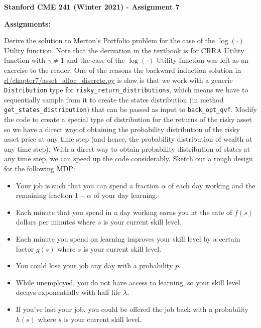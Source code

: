\documentclass[12pt]{exam}
\begin{document}
\begin{center}
{\large {\bf Stanford CME 241 (Winter 2021) - Assignment 7}}
\end{center}
 
{\large{\bf Assignments:}}
\begin{questions}
\question Derive the solution to Merton's Portfolio problem for the case of the $\log(\cdot)$ Utility function. Note that the derivation in the textbook is for CRRA Utility function with $\gamma \neq 1$ and the case of the $\log(\cdot)$ Utility function was left as an exercise to the reader.
\question One of the reasons the backward induction solution in \href{https://github.com/TikhonJelvis/RL-book/blob/master/rl/chapter7/asset_alloc_discrete.py}{rl\//chapter7\//asset\_alloc\_discrete.py} is slow is that we work with a generic \lstinline{Distribution} type for \lstinline{risky_return_distributions}, which means we have to sequentially sample from it to create the states distribution (in method \lstinline{get_states_distribution}) that can be passed as input to \lstinline{back_opt_qvf}. Modify the code to create a special type of distribution for the returns of the risky asset so we have a direct way of obtaining the probability distribution of the risky asset price at any time step (and hence, the probability distribution of wealth at any time step). With a direct way to obtain probability distribution of states at any time step, we can speed up the code considerably. 
\question Sketch out a rough design for the following MDP:
\begin{itemize}
\item Your job is such that you can spend a fraction $\alpha$ of each day working and the remaining fraction $1-\alpha$ of your day learning.
\item Each minute that you spend in a day working earns you at the rate of $f(s)$ dollars per minutes where $s$ is your current skill level.
\item Each minute you spend on learning improves your skill level by a certain factor $g(s)$ where $s$ is your current skill level.
\item You could lose your job any day with a probability $p$.
\item While unemployed, you do not have access to learning, so your skill level decays exponentially with half life $\lambda$.
\item If you've lost your job, you could be offered the job back with a probability $h(s)$ where $s$ is your current skill level.
\end{itemize}


\end{questions}
\end{document}
